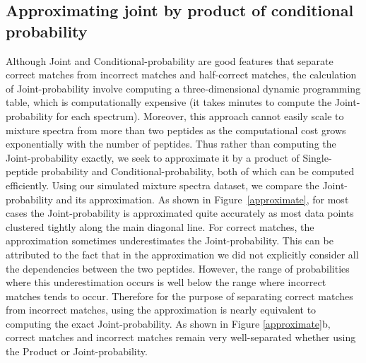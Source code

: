 \documentclass[runningheads,a4paper]{llncs}
\begin{document}
\subsection*{Approximating joint by product of conditional probability}
Although Joint and Conditional-probability are good features that separate correct matches from incorrect matches and half-correct matches, the calculation of Joint-probability involve computing a three-dimensional dynamic programming table, which is computationally expensive (it takes minutes to compute the Joint-probability for each spectrum).  Moreover, this approach cannot easily scale to mixture spectra from more than two peptides as the computational cost grows exponentially with the number of peptides.  Thus rather than computing the Joint-probability exactly, we seek to approximate it by a product of Single-peptide probability and Conditional-probability, both of which can be computed efficiently.  Using our simulated mixture spectra dataset, we compare the Joint-probability and its approximation.  As shown in Figure~\ref{approximate}, for most cases the Joint-probability is approximated quite accurately as most data points clustered tightly along the main diagonal line.  For correct matches, the approximation sometimes underestimates the Joint-probability.  This can be attributed to the fact that in the approximation we did not explicitly consider all the dependencies between the two peptides.  However, the range of probabilities where this underestimation occurs is well below the range where incorrect matches tends to occur.  Therefore for the purpose of separating correct matches from incorrect matches, using the approximation is nearly equivalent to computing the exact Joint-probability. As shown in Figure \ref{approximate}b, correct matches and incorrect matches remain very well-separated whether using the Product or Joint-probability.
\end{document}
